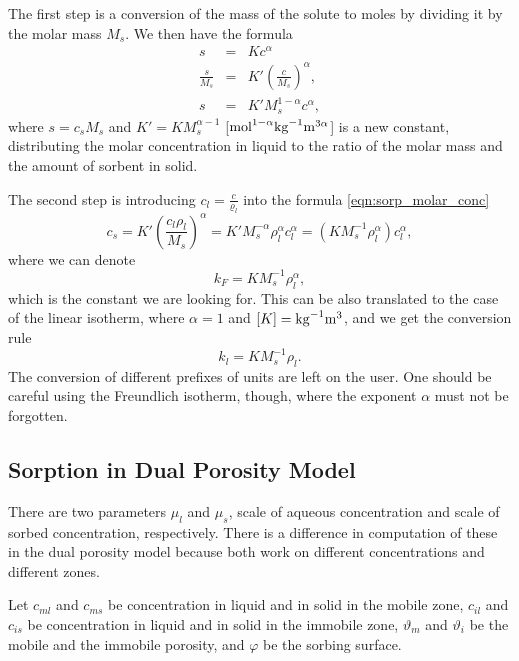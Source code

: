 The first step is a conversion of the mass of the solute to moles by dividing it by the
molar mass $M_s$. We then have the formula 
\begin{eqnarray}
s&=&Kc^{\alpha} \nonumber \\
\frac{s}{M_s} &=& K'\left(\frac{c}{M_s}\right)^\alpha, \label{eqn:sorp_molar_conc}\\
s &=& K'M_s^{1-\alpha}c^\alpha, \nonumber 
\end{eqnarray}
where $s=c_sM_s$ and $K'=KM_s^{\alpha-1}$ [$\rm{mol}^{1-\alpha}\rm{kg}^{-1}\rm{m}^{3\alpha}$] is a new constant,
distributing the molar concentration in liquid to the ratio of the molar mass and the amount of sorbent in solid.

The second step is introducing $c_l = \frac{c}{\varrho_l}$ into the formula \eqref{eqn:sorp_molar_conc}
\begin{equation}
c_s = K'\left(\frac{c_l \rho_l }{M_s}\right)^\alpha
= K' M_s^{-\alpha}\rho_l^{\alpha}c_l^\alpha 
= \left( K M_s^{-1}\rho_l^{\alpha} \right) c_l^\alpha,
\end{equation}
where we can denote 
\begin{equation}
k_F=K M_s^{-1}\rho_l^{\alpha},
\end{equation} 
which is the constant we are looking for. This can be also translated to the case of the linear isotherm, where
$\alpha=1$ and $[K] = \rm{kg}^{-1}\rm{m}^{3}$, and we get the conversion rule
\begin{equation}
k_l=K M_s^{-1}\rho_l.
\end{equation} 
The conversion of different prefixes of units are left on the user. One should be careful using the 
Freundlich isotherm, though, where the exponent $\alpha$ must not be forgotten.


\subsection{Sorption in Dual Porosity Model} 
\label{subsec:sorp_dual_por}
There are two parameters $\mu_l$ and $\mu_s$, scale of aqueous concentration and scale of sorbed concentration, respectively.  
There is a difference in computation of these in the dual porosity model because both work on different concentrations
and different zones.

Let $c_{ml}$ and $c_{ms}$ be concentration in liquid and in solid in the mobile zone, 
$c_{il}$ and $c_{is}$ be concentration in liquid and in solid in the immobile zone,
$\vartheta_m$ and $\vartheta_i$ be the mobile and the immobile porosity,
and $\varphi$ be the sorbing surface.

